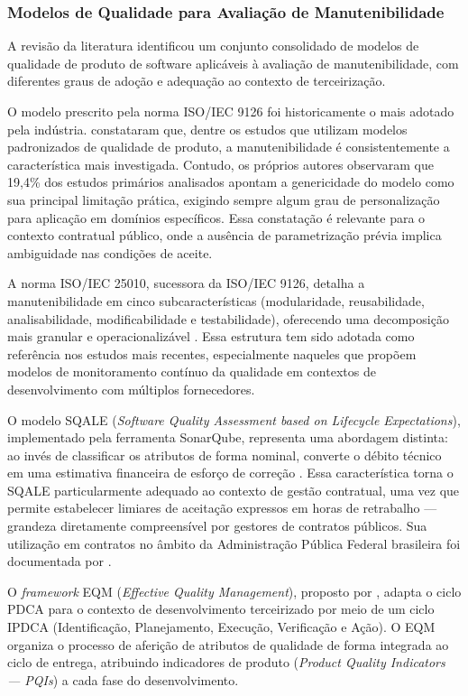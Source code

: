 \subsubsection{Modelos de Qualidade para Avaliação de Manutenibilidade}

A revisão da literatura identificou um conjunto consolidado de modelos de qualidade de produto de software aplicáveis à avaliação de manutenibilidade, com diferentes graus de adoção e adequação ao contexto de terceirização.

O modelo prescrito pela norma ISO/IEC 9126 foi historicamente o mais adotado pela indústria.  constataram que, dentre os estudos que utilizam modelos padronizados de qualidade de produto, a manutenibilidade é consistentemente a característica mais investigada. Contudo, os próprios autores observaram que 19,4\% dos estudos primários analisados apontam a genericidade do modelo como sua principal limitação prática, exigindo sempre algum grau de personalização para aplicação em domínios específicos. Essa constatação é relevante para o contexto contratual público, onde a ausência de parametrização prévia implica ambiguidade nas condições de aceite.

A norma ISO/IEC 25010, sucessora da ISO/IEC 9126, detalha a manutenibilidade em cinco subcaracterísticas (modularidade, reusabilidade, analisabilidade, modificabilidade e testabilidade), oferecendo uma decomposição mais granular e operacionalizável \cite{tools2020monitoring}. Essa estrutura tem sido adotada como referência nos estudos mais recentes, especialmente naqueles que propõem modelos de monitoramento contínuo da qualidade em contextos de desenvolvimento com múltiplos fornecedores.

O modelo SQALE (\textit{Software Quality Assessment based on Lifecycle Expectations}), implementado pela ferramenta SonarQube, representa uma abordagem distinta: ao invés de classificar os atributos de forma nominal, converte o débito técnico em uma estimativa financeira de esforço de correção \cite{letouzey2010}. Essa característica torna o SQALE particularmente adequado ao contexto de gestão contratual, uma vez que permite estabelecer limiares de aceitação expressos em horas de retrabalho — grandeza diretamente compreensível por gestores de contratos públicos. Sua utilização em contratos no âmbito da Administração Pública Federal brasileira foi documentada por .

O \textit{framework} EQM (\textit{Effective Quality Management}), proposto por , adapta o ciclo PDCA para o contexto de desenvolvimento terceirizado por meio de um ciclo IPDCA (Identificação, Planejamento, Execução, Verificação e Ação). O EQM organiza o processo de aferição de atributos de qualidade de forma integrada ao ciclo de entrega, atribuindo indicadores de produto (\textit{Product Quality Indicators — PQIs}) a cada fase do desenvolvimento.


